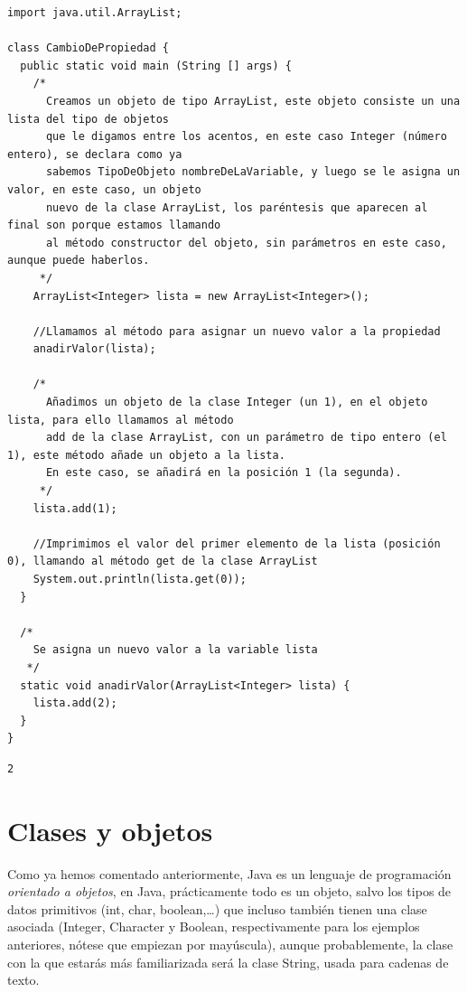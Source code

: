 \documentclass[11pt]{article}
\begin{document}
\begin{verbatim}
import java.util.ArrayList;

class CambioDePropiedad {
  public static void main (String [] args) {
    /*
      Creamos un objeto de tipo ArrayList, este objeto consiste un una lista del tipo de objetos
      que le digamos entre los acentos, en este caso Integer (número entero), se declara como ya
      sabemos TipoDeObjeto nombreDeLaVariable, y luego se le asigna un valor, en este caso, un objeto
      nuevo de la clase ArrayList, los paréntesis que aparecen al final son porque estamos llamando
      al método constructor del objeto, sin parámetros en este caso, aunque puede haberlos.
     */
    ArrayList<Integer> lista = new ArrayList<Integer>();

    //Llamamos al método para asignar un nuevo valor a la propiedad
    anadirValor(lista);

    /*
      Añadimos un objeto de la clase Integer (un 1), en el objeto lista, para ello llamamos al método
      add de la clase ArrayList, con un parámetro de tipo entero (el 1), este método añade un objeto a la lista.
      En este caso, se añadirá en la posición 1 (la segunda).
     */
    lista.add(1);

    //Imprimimos el valor del primer elemento de la lista (posición 0), llamando al método get de la clase ArrayList
    System.out.println(lista.get(0));
  }

  /*
    Se asigna un nuevo valor a la variable lista
   */
  static void anadirValor(ArrayList<Integer> lista) {
    lista.add(2);
  }
}
\end{verbatim}

\begin{verbatim}
2
\end{verbatim}

\section{Clases y objetos}
\label{sec:org76e9b08}
Como ya hemos comentado anteriormente, Java es un lenguaje de programación \emph{orientado a objetos}, en Java, prácticamente todo es un objeto, salvo los tipos de datos primitivos (int, char, boolean,\ldots{}) que incluso también tienen una clase asociada (Integer, Character y Boolean, respectivamente para los ejemplos anteriores, nótese que empiezan por mayúscula), aunque probablemente, la clase con la que estarás más familiarizada será la clase String, usada para cadenas de texto.
\end{document}
